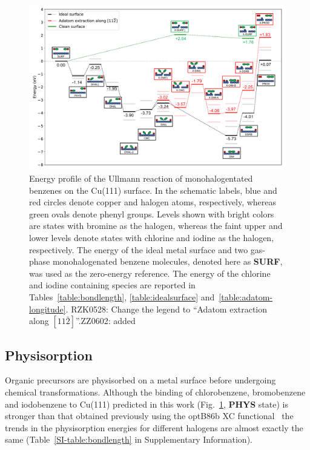 \documentclass[%
 reprint,
 amsmath,amssymb,
 aps,
prb,
floatfix,
]{revtex4-2}
\newcommand{\lock}{\color{red}}
\newcommand{\zhzh}{\color{blue}}
\newcommand{\lock}{\color{red}}
\newcommand{\zhzh}{\color{blue}}
\newcommand{\comm}{\color{Purple}} %
\newcommand{\sinfo}{Supplementary Information}
\begin{document}
\begin{figure}[hbt]
\centering
\includegraphics[width=1.\textwidth]{Fig/main-profile.pdf}
\caption{Energy profile of the Ullmann reaction of monohalogentated benzenes on the Cu(111) surface. In the schematic labels, blue and red circles denote copper and halogen atoms, respectively, whereas green ovals denote phenyl groups. Levels shown with bright colors are states with bromine as the halogen, whereas the faint upper and lower levels denote states with chlorine and iodine as the halogen, respectively. The energy of the ideal metal surface and two gas-phase monohalogenated benzene molecules, denoted here as \textbf{SURF}, was used as the zero-energy reference. The energy of the chlorine and iodine containing species are reported in Tables~\ref{table:bondlength}, \ref{table:idealsurface} and~\ref{table:adatom-longitude}. {\comm RZK0528: Change the legend to ``Adatom extraction along $[11\bar{2}]$''.}{\zhzh ZZ0602: added}} 
\label{fig:completeenergy}
\end{figure}

\ifdefined\INTERNAL
\subsection{Physisorption}
\fi

{\lock
Organic precursors are physisorbed on a metal surface before undergoing chemical transformations. 
Although the binding of chlorobenzene, bromobenzene and iodobenzene to Cu(111) predicted in this work (Fig.~\ref{fig:completeenergy}, \textbf{PHYS} state) is stronger than that obtained previously using the optB86b XC functional~\cite{jacs2013} the trends in the physisorption energies for different halogens are almost exactly the same (Table~\ref{SI-table:bondlength} in \sinfo).
}
\end{document}
